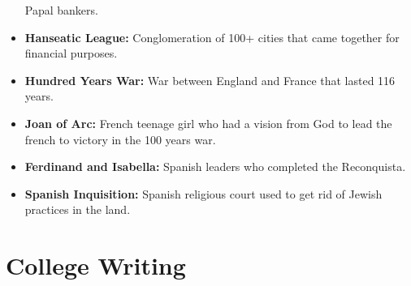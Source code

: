 \documentclass[crop=false,class=book]{standalone}
\begin{document}
\begin{itemize}[noitemsep]
                    Papal bankers.
                \item \textbf{Hanseatic League:}
                    Conglomeration of 100+ cities that came
                    together for financial purposes.
                \item \textbf{Hundred Years War:}
                    War between England and France that lasted
                    116 years. 
                \item \textbf{Joan of Arc:}
                    French teenage girl who had a vision from
                    God to lead the french to victory in
                    the 100 years war.
                \item \textbf{Ferdinand and Isabella:}
                    Spanish leaders who completed the Reconquista.
                \item \textbf{Spanish Inquisition:}
                    Spanish religious court used to get rid of
                    Jewish practices in the land.
            \end{itemize}
    \section{College Writing}
\end{document}
